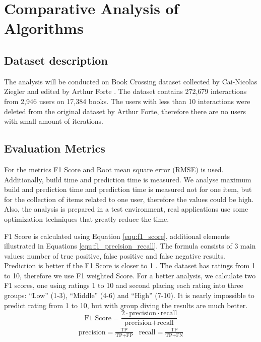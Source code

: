 \section{Comparative Analysis of Algorithms}\label{sec:dataset_analysis}

\subsection{Dataset description} %
The analysis will be conducted on Book Crossing dataset collected by Cai-Nicolas Ziegler and edited by Arthur Forte \cite{Dataset}. The dataset contains 272,679 interactions from 2,946 users on 17,384 books. The users with less than 10 interactions were deleted from the original dataset by Arthur Forte, therefore there are no users with small amount of iterations.

\subsection{Evaluation Metrics} %
For the metrics F1 Score and Root mean square error (RMSE) is used. Additionally, build time and prediction time is measured. We analyse maximum build and prediction time and prediction time is measured not for one item, but for the collection of items related to one user, therefore the values could be high. Also, the analysis is prepared in a test environment, real applications use some optimization techniques that greatly reduce the time.

F1 Score is calculated using Equation \eqref{equ:f1_score}, additional elements illustrated in Equations \eqref{equ:f1_precision_recall}. The formula consists of 3 main values: number of true positive, false positive and false negative results. Prediction is better if the F1 Score is closer to 1 \cite{F1Score}. The dataset has ratings from 1 to 10, therefore we use F1 weighted Score. For a better analysis, we calculate two F1 scores, one using ratings 1 to 10 and second placing each rating into three groups: “Low” (1-3), “Middle” (4-6) and “High” (7-10). It is nearly impossible to predict rating from 1 to 10, but with group diving the results are much better.
\begin{equation}
        \text{F1 Score} = \frac{2 \cdot \text{precision} \cdot \text{recall}}{\text{precision} + \text{recall}}\label{equ:f1_score}
\end{equation}
\begin{align}
        &\text{precision} = \frac{\text{TP}}{\text{TP} + \text{FP}} &
        \text{recall} = \frac{\text{TP}}{\text{TP} + \text{FN}} &\label{equ:f1_precision_recall}
\end{align}

